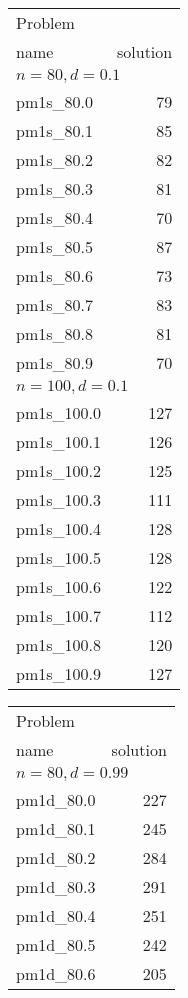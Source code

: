 \documentclass[a4paper, 12pt]{article}
\begin{document}
\begin{table} \begin{center}
\begin{minipage}{30ex}
\begin{tabular}{|l|r|}
\hline
Problem& \\
name   &solution \\
\hline
\multicolumn{2}{|l|}{$n=80, d=0.1$}\\
\hline
pm1s\_80.0 & 79 \\
pm1s\_80.1 & 85 \\
pm1s\_80.2 & 82 \\
pm1s\_80.3 & 81 \\
pm1s\_80.4 & 70 \\
pm1s\_80.5 & 87 \\
pm1s\_80.6 & 73 \\
pm1s\_80.7 & 83 \\
pm1s\_80.8 & 81 \\
pm1s\_80.9 & 70 \\
\hline
\multicolumn{2}{|l|}{$n=100, d=0.1$}\\
\hline
pm1s\_100.0 & 127 \\
pm1s\_100.1 & 126 \\
pm1s\_100.2 & 125 \\
pm1s\_100.3 & 111 \\
pm1s\_100.4 & 128 \\
pm1s\_100.5 & 128 \\
pm1s\_100.6 & 122 \\
pm1s\_100.7 & 112 \\
pm1s\_100.8 & 120 \\
pm1s\_100.9 & 127 \\
\hline
\end{tabular}
\end{minipage}
\begin{minipage}{30ex}
\begin{tabular}{|l|r|}
\hline
Problem& \\
name & solution \\
\hline
\multicolumn{2}{|l|}{$n=80, d=0.99$}\\
\hline
pm1d\_80.0 & 227 \\
pm1d\_80.1 & 245 \\
pm1d\_80.2 & 284 \\
pm1d\_80.3 & 291 \\
pm1d\_80.4 & 251 \\
pm1d\_80.5 & 242 \\
pm1d\_80.6 & 205 \\

\end{tabular}
\end{minipage}
\end{center}
\end{table}
\end{document}
